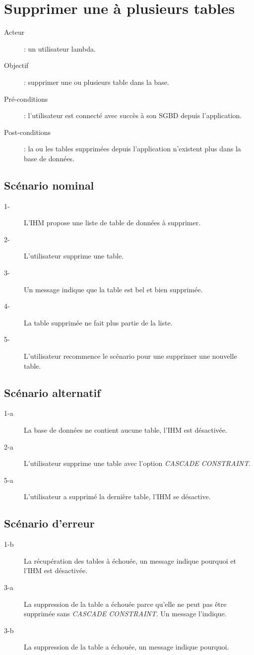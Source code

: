 \section{Supprimer une à plusieurs tables}
\begin{description}
\item[Acteur] : un utilisateur lambda.
\item[Objectif] : supprimer une ou plusieurs table dans la base.
\item[Pré-conditions] : l'utilisateur est connecté avec succès à son SGBD depuis l'application.
  \item[Post-conditions] : la ou les tables supprimées depuis l'application n'existent plus dans la base de données.
\end{description}

\subsection{Scénario nominal}
\begin{description}
\item[1-] L'IHM propose une liste de table de données à supprimer.
\item[2-] L'utilisateur supprime une table.
\item[3-] Un message indique que la table est bel et bien supprimée.
\item[4-] La table supprimée ne fait plus partie de la liste.
\item[5-] L'utilisateur recommence le scénario pour une supprimer une nouvelle table.
\end{description}

\subsection{Scénario alternatif}
\begin{description}
\item[1-a] La base de données ne contient aucune table, l'IHM est désactivée.
\item[2-a] L'utilisateur supprime une table avec l'option \textit{CASCADE CONSTRAINT}.
  \item[5-a] L'utilisateur a supprimé la dernière table, l'IHM se désactive.
\end{description}

\subsection{Scénario d'erreur}
\begin{description}
\item[1-b] La récupération des tables à échouée, un message indique pourquoi et l'IHM est désactivée.
\item[3-a] La suppression de la table a échouée parce qu'elle ne peut pas être supprimée sans \textit{CASCADE CONSTRAINT}. Un message l'indique.
\item[3-b] La suppression de la table a échouée, un message indique pourquoi.
\end{description}

